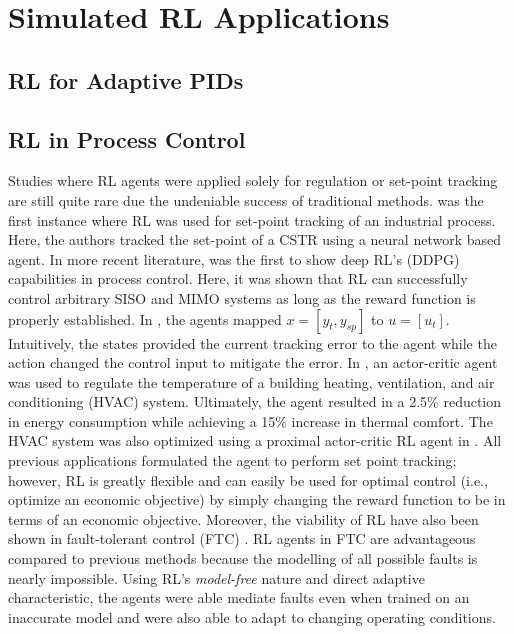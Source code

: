 \section{Simulated RL Applications}
\subsection{RL for Adaptive PIDs}
















\subsection{RL in Process Control}
Studies where RL agents were applied solely for regulation or set-point tracking are still quite rare due the undeniable success of traditional methods. \cite{pc} was the first instance where RL was used for set-point tracking of an industrial process. Here, the authors tracked the set-point of a CSTR using a neural network based agent. In more recent literature, \cite{pc1} was the first to show deep RL's (DDPG) capabilities in process control.  Here, it was shown that RL can successfully control arbitrary SISO and MIMO systems as long as the reward function is properly established.  In \cite{pc1}, the agents mapped $x = [y_t, y_{sp}]$ to $u = [u_t]$. Intuitively, the states provided the current tracking error to the agent while the action changed the control input to mitigate the error. In \cite{pc2}, an actor-critic agent was used to regulate the temperature of a building heating, ventilation, and air conditioning (HVAC) system. Ultimately, the agent resulted in a 2.5\% reduction in energy consumption while achieving a 15\% increase in thermal comfort. The HVAC system was also optimized using a proximal actor-critic RL agent in \cite{pc3}. All previous applications formulated the agent to perform set point tracking; however, RL is greatly flexible and can easily be used for optimal control (i.e., optimize an economic objective) by simply changing the reward function to be in terms of an economic objective. Moreover, the viability of RL have also been shown in fault-tolerant control (FTC) \cite{ftc}. RL agents in FTC are advantageous compared to previous methods because the modelling of all possible faults is nearly impossible.  Using RL's \textit{model-free} nature and direct adaptive characteristic, the agents were able mediate faults even when trained on an inaccurate model and were also able to adapt to changing operating conditions.













